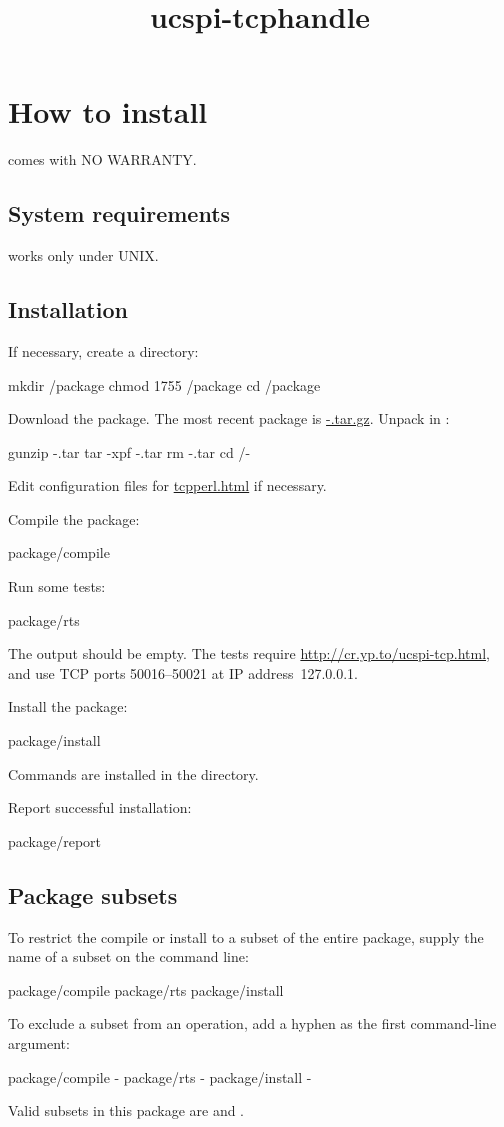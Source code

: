 \documentclass{book}
\title{ucspi-tcphandle}
\begin{document}
\section{How to install \package}

\package{} comes with NO WARRANTY.

\subsection{System requirements}
\package{} works only under UNIX.

\subsection{Installation}
If necessary, create a  directory:
\begin{code}%
  mkdir /package
  chmod 1755 /package
  cd /package
\end{code}

Download the \package{} package.  The most recent \package
package is
\href{\package~\version}{\package-\version.tar.gz}.
Unpack \package{} in :
\begin{code}%
  gunzip \package-\version.tar
  tar -xpf \package-\version.tar
  rm \package-\version.tar
  cd \path/\package-\version
\end{code}

Edit configuration files for \href{\cmd{tcpperl}}{tcpperl.html}
if necessary.

Compile the package:
\begin{code}%
  package/compile
\end{code}

Run some tests:
\begin{code}%
  package/rts
\end{code}
The output should be empty.  The tests require
\href{ucspi-tcp}{http://cr.yp.to/ucspi-tcp.html}, and use TCP ports
50016--50021 at IP address~127.0.0.1.

Install the package:
\begin{code}%
  package/install
\end{code}

Commands are installed in the
 directory.

Report successful installation:
\begin{code}%
  package/report
\end{code}

\subsection{Package subsets}
To restrict the compile or install to a subset of the entire package,
supply the name of a subset on the command line:
\begin{code}%
  package/compile 
  package/rts 
  package/install 
\end{code}

To exclude a subset from an operation, add a hyphen as the first
command-line argument:
\begin{code}%
  package/compile - 
  package/rts - 
  package/install - 
\end{code}

Valid subsets in this package are  and .
\end{document}
